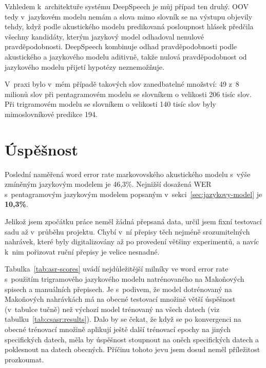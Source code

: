 Vzhledem k~architektuře systému DeepSpeech je můj případ ten druhý. OOV tedy
v~jazykovém modelu nemám a slova mimo slovník se na výstupu objevily tehdy, když
podle akustického modelu predikovaná posloupnost hlásek předčila všechny
kandidáty, kterým jazykový model odhadoval nenulové pravděpodobnosti. DeepSpeech
kombinuje odhad pravděpodobnosti podle akustického a jazykového modelu aditivně,
takže nulová pravděpodobnost od jazykového modelu přijetí hypotézy neznemožňuje.

V~praxi bylo v~mém případě takových slov zanedbatelné množství: 49 z~8 milionů
slov při pentagramovém modelu se slovníkem o velikosti 206 tisíc slov. Při
trigramovém modelu se slovníkem o velikosti 140 tisíc slov byly mimoslovníkové
predikce 194.

\section{Úspěšnost}
\label{sec:evaluace}

Poslední naměřená word error rate markovovského akustického modelu s~výše zmíněným
jazykovým modelem je 46,3\%. Nejnižší dosažená WER s~pentagramovým jazykovým
modelem popsaným v~sekci~\ref{sec:jazykovy-model} je \textbf{10,3\%}.

Jelikož jsem zpočátku práce neměl žádná přepsaná data, určil jsem fixní testovací sadu
až v~průběhu projektu. Chybí v~ní přepisy těch
nejméně srozumitelných nahrávek, které byly digitalizovány až po provedení
většiny experimentů, a navíc k~nim pořizovat ruční přepisy je velice nesnadné.

Tabulka~\ref{tab:asr-scores} uvádí nejdůležitější milníky ve word error rate
s~použitím trigramového jazykového modelu natrénovaného na Makoňových spisech a
manuálních přepisech. Je
s~podivem, že model dotrénovaný na Makoňových nahrávkách má na obecné testovací
množině větší úspěšnost (v~tabulce tučně) než výchozí model trénovaný na všech datech
(viz tabulku~\ref{tab:csasr:results}). Dalo by se čekat, že
když se po konvergenci na obecné trénovací množině aplikují ještě
další trénovací epochy na jiných specifických datech, měla by úspěšnost stoupnout na
oněch specifických datech a poklesnout na datech obecných. Příčinu tohoto jevu
jsem dosud neměl příležitost prozkoumat.


